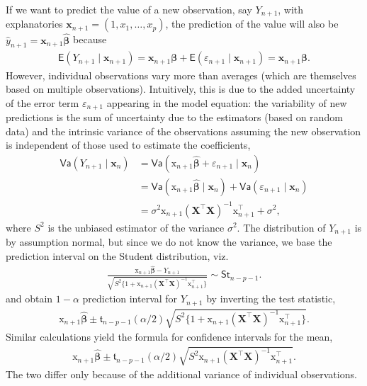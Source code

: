 \documentclass[
  11pt,
  letterpaper,
]{book}
\theoremstyle{definition}
\theoremstyle{definition}
\theoremstyle{definition}
\theoremstyle{remark}
\begin{document}
If we want to predict the value of a new observation, say \(Y_{n+1}\), with explanatories \(\mathbf{x}_{n+1} = (1, x_1, \ldots, x_p)\), the prediction of the value will also be \(\widehat{y}_{n+1} = \mathbf{x}_{n+1}\widehat{\boldsymbol{\beta}}\) because
\begin{align*}
\mathsf{E}(Y_{n+1} \mid \mathbf{x}_{n+1}) = \mathbf{x}_{n+1}\boldsymbol{\beta} + \mathsf{E}(\varepsilon_{n+1} \mid \mathbf{x}_{n+1}) = \mathbf{x}_{n+1}\boldsymbol{\beta}.
\end{align*}
However, individual observations vary more than averages (which are themselves based on multiple observations). Intuitively, this is due to the added uncertainty of the error term \(\varepsilon_{n+1}\) appearing in the model equation: the variability of new predictions is the sum of uncertainty due to the estimators (based on random data) and the intrinsic variance of the observations assuming the new observation is independent of those used to estimate the coefficients,
\begin{align*}
\mathsf{Va}(Y_{n+1} \mid \mathbf{x}_n) &= \mathsf{Va}(\mathrm{x}_{n+1}\widehat{\boldsymbol{\beta}} + \varepsilon_{n+1} \mid \mathbf{x}_n)
\\&=\mathsf{Va}(\mathrm{x}_{n+1}\widehat{\boldsymbol{\beta}} \mid \mathbf{x}_n) +\mathsf{Va}(\varepsilon_{n+1} \mid \mathbf{x}_n) 
\\& = \sigma^2\mathrm{x}_{n+1}(\mathbf{X}^\top\mathbf{X})^{-1}\mathrm{x}_{n+1}^\top + \sigma^2,
\end{align*}
where \(S^2\) is the unbiased estimator of the variance \(\sigma^2\). The distribution of \(Y_{n+1}\) is by assumption normal, but since we do not know the variance, we base the prediction interval on the Student distribution, viz.
\begin{align*}
\frac{\mathrm{x}_{n+1}\widehat{\boldsymbol{\beta}}-Y_{n+1}}{\sqrt{S^2\{1+\mathrm{x}_{n+1}(\mathbf{X}^\top\mathbf{X})^{-1}\mathrm{x}_{n+1}^\top\}}}\sim \mathsf{St}_{n-p-1}.
\end{align*}
and obtain \(1-\alpha\) prediction interval for \(Y_{n+1}\) by inverting the test statistic,
\begin{align*}
\mathrm{x}_{n+1}\widehat{\boldsymbol{\beta}}\pm \mathfrak{t}_{n-p-1}(\alpha/2)\sqrt{S^2\{1+\mathrm{x}_{n+1}(\mathbf{X}^\top\mathbf{X})^{-1}\mathrm{x}_{n+1}^\top\}}.
\end{align*}
Similar calculations yield the formula for confidence intervals for the mean,
\begin{align*}
\mathrm{x}_{n+1}\widehat{\boldsymbol{\beta}}\pm \mathfrak{t}_{n-p-1}(\alpha/2)\sqrt{S^2\mathrm{x}_{n+1}(\mathbf{X}^\top\mathbf{X})^{-1}\mathrm{x}_{n+1}^\top}.
\end{align*}
The two differ only because of the additional variance of individual observations.
\end{document}
